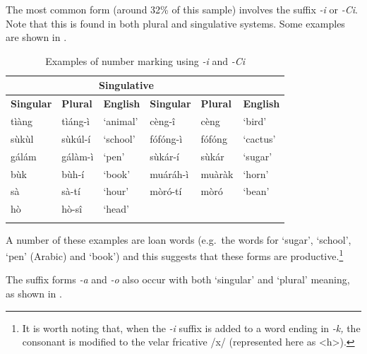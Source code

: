 \documentclass[output=paper]{langsci/langscibook}
\begin{document}
The most common form (around 32\% of this sample) involves the suffix \textit{-i} or \textit{-Ci}. Note that this is found in both plural and singulative systems. Some examples are shown in .  

\begin{table}
\begin{tabularx}{\textwidth}{XXXXXX}
\lsptoprule

\multicolumn{3}{c}{ \textbf{Plurative}} & \multicolumn{3}{c}{ \textbf{Singulative}}\\ \midrule
 \textbf{Singular} & \textbf{Plural} & \textbf{English} & \textbf{Singular} & \textbf{Plural} & \textbf{English}\\ \midrule
 t\`{i}\`{a}ng &  t\`{i}\'{a}ng-\`{i} & ‘animal’ &  c\`{e}ng-\^{i} &  c\`{e}ng & ‘bird’\\
 s\`{u}k\`{u}l &  s\`{u}k\'{u}l-\'{i} & ‘school’ &  f\'{o}f\'{o}ng-\`{i} &  f\'{o}f\'{o}ng & ‘cactus’\\
 g\'{a}l\'{a}m &  g\'{a}l\`{a}m-\`{i} & ‘pen’ &  s\`{u}k\'{a}r-\'{i} &  s\`{u}k\'{a}r & ‘sugar’\\
 b\`{u}k &  b\`{u}h-\'{i} & ‘book’ &  mu\'{a}r\'{a}h-\`{i} &  mu\`{a}r\`{a}k & ‘horn’\\
 s\`{a} &  s\`{a}-t\'{i} & ‘hour’ &  m\`{o}r\'{o}-t\'{i} &  m\`{o}r\'{o} & ‘bean’\\
 h\`{o} &  h\`{o}-s\^{i} & ‘head’ &  &  & \\
\lspbottomrule
\end{tabularx}
\caption{Examples of number marking using \textit{-i} and \textit{{}-Ci}}
\label{tab:moodie:10}
\end{table}

A number of these examples are loan words (e.g.\ the words for ‘sugar’, ‘school’, ‘pen’ (Arabic) and ‘book’) and this suggests that these forms are productive.\footnote{ It is worth noting that, when the \textit{{}-i} suffix is added to a word ending in \textit{{}-k,} the consonant is modified to the velar fricative /x/ (represented here as {\textless}h{\textgreater}).} 

The suffix forms \textit{{}-a }and \textit{{}-o} also occur with both `singular' and `plural' meaning, as shown in . 
\end{document}
